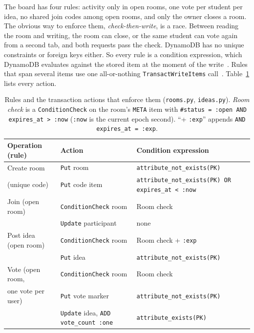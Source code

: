 The board has four rules: activity only in open rooms, one vote per student per idea, no shared
join codes among open rooms, and only the owner closes a room. The obvious way to enforce them,
\emph{check-then-write}, is a race. Between reading the room and writing, the room can close, or
the same student can vote again from a second tab, and both requests pass the check. DynamoDB
has no unique constraints or foreign keys either. So every rule is a condition expression, which
DynamoDB evaluates against the stored item at the moment of the write~\cite{condition-expressions}.
Rules that span several items use one all-or-nothing \texttt{TransactWriteItems}
call~\cite{transactions}. Table~\ref{tab:rules} lists every action.

\begin{table}[htbp]
  \centering
  \footnotesize
  \caption{Rules and the transaction actions that enforce them (\texttt{rooms.py},
    \texttt{ideas.py}). \textit{Room check} is a \texttt{ConditionCheck} on the room's
    \texttt{META} item with \texttt{\#status = :open AND expires\_at \textgreater{} :now}
    (\texttt{:now} is the current epoch second). ``+ \texttt{:exp}'' appends
    \texttt{AND expires\_at = :exp}.}
  \label{tab:rules}
  \begin{tabularx}{\linewidth}{@{}>{\raggedright\arraybackslash}p{2.5cm}l>{\raggedright\arraybackslash}X@{}}
    \toprule
    Operation (rule) & Action & Condition expression \\
    \midrule
    Create room & \texttt{Put} room & \texttt{attribute\_not\_exists(PK)} \\
    (unique code) & \texttt{Put} code item &
      \texttt{attribute\_not\_exists(PK) OR expires\_at \textless{} :now} \\
    \addlinespace
    Join (open room) & \texttt{ConditionCheck} room & Room check \\
     & \texttt{Update} participant & none \\
    \addlinespace
    Post idea (open room) & \texttt{ConditionCheck} room & Room check + \texttt{:exp} \\
     & \texttt{Put} idea & \texttt{attribute\_not\_exists(PK)} \\
    \addlinespace
    Vote (open room, & \texttt{ConditionCheck} room & Room check \\
    one vote per user) & \texttt{Put} vote marker & \texttt{attribute\_not\_exists(PK)} \\
     & \texttt{Update} idea, \texttt{ADD vote\_count :one} & \texttt{attribute\_exists(PK)} \\

\end{tabularx}
\end{table}
